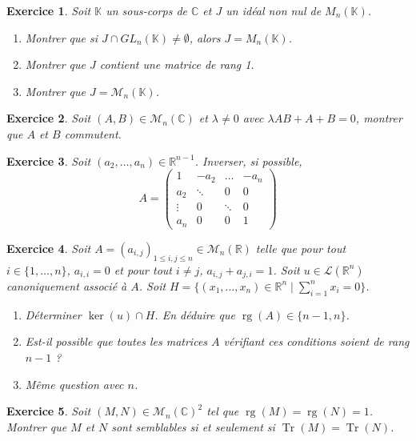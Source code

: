 \documentclass[12pt]{article}
\newtheorem{exercise}{Exercice}[section]
\theoremstyle{remark}
\theoremstyle{remark}
\newcommand{\K}{\mathbb{K}}
\newcommand{\R}{\mathbb{R}}
\newcommand{\C}{\mathbb{C}}
\newcommand{\M}{\mathcal{M}}
\renewcommand{\L}{\mathcal{L}}
\DeclareMathOperator{\rg}{rg}
\DeclareMathOperator{\Tr}{Tr}
\begin{document}
\begin{exercise}
	Soit $\K$ un sous-corps de $\C$ et $J$ un idéal non nul de $M_{n}(\K)$.
	\begin{enumerate}
		\item Montrer que si $J\cap GL_{n}(\K)\neq\emptyset$, alors $J=M_{n}(\K)$.
		\item Montrer que $J$ contient une matrice de rang 1.
		\item Montrer que $J=\M_{n}(\K)$.
	\end{enumerate}
\end{exercise}

\begin{exercise}
	Soit $(A,B)\in\M_{n}(\C)$ et $\lambda\neq 0$ avec $\lambda AB+A+B=0$, montrer que $A$ et $B$ commutent.
\end{exercise}

\begin{exercise}
	Soit $(a_{2},\dots,a_{n})\in\R^{n-1}$. Inverser, si possible,
	$$
	A=
	\begin{pmatrix}
		1 		& -a_{2}	& \dots		& -a_{n}\\
		a_{2} 	& \ddots 	& 0			& 0\\
		\vdots 	& 0			& \ddots 	& 0\\
		a_{n}	& 0			& 0			& 1
	\end{pmatrix}
	$$
\end{exercise}

\begin{exercise}
	Soit $A=(a_{i,j})_{1\leqslant i,j\leqslant n}\in\M_{n}(\R)$ telle que pour
	tout $i\in\{1,\dots,n\}$, $a_{i,i}=0$ et pour tout $i\neq j$,
	$a_{i,j}+a_{j,i}=1$. Soit $u\in\L(\R^{n})$ canoniquement associé à $A$. Soit
	$H=\{(x_{1},\dots,x_{n})\in\R^{n}\mid\sum_{i=1}^{n}x_{i}=0\}$.
	\begin{enumerate}
		\item Déterminer $\ker(u)\cap H$. En déduire que $\rg(A)\in\{n-1,n\}$.
		\item Est-il possible que toutes les matrices $A$ vérifiant ces
		conditions soient de rang $n-1$ ?
		\item Même question avec $n$.
	\end{enumerate}
\end{exercise}

\begin{exercise}
	Soit $(M,N)\in\M_{n}(\C)^{2}$ tel que $\rg(M)=\rg(N)=1$. Montrer que $M$ et
	$N$ sont semblables si et seulement si $\Tr(M)=\Tr(N)$.
\end{exercise}
\end{document}
